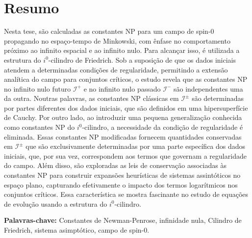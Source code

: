 
\section*{Resumo}


Nesta tese, são calculadas as constantes NP para um campo de spin-0 propagando no espaço-tempo de Minkowski, com ênfase no comportamento próximo ao infinito espacial e ao infinito nulo. Para alcançar isso, é utilizada a estrutura do $i^0$-cilindro de Friedrich. Sob a suposição de que os dados iniciais atendem a determinadas condições de regularidade, permitindo a extensão analítica do campo para conjuntos críticos, o estudo revela que as constantes NP no infinito nulo futuro $\mathscr{I}^{+}$ e no infinito nulo passado $\mathscr{I}^{-}$ são independentes uma da outra. Noutras palavras, as constantes NP clássicas em $\mathscr{I}^{\pm}$ são determinadas por partes diferentes dos dados iniciais, que são definidos em uma hipersuperfície de Cauchy.
Por outro lado, ao introduzir uma pequena generalização conhecida como constantes NP do $i^0$-cilindro, a necessidade da condição de regularidade é eliminada. Essas constantes NP modificadas fornecem quantidades conservadas em $\mathscr{I}^{\pm}$ que são exclusivamente determinadas por uma parte específica dos dados iniciais, que, por sua vez, correspondem aos termos que governam a regularidade do campo. Além disso, são exploradas as leis de conservação associadas às constantes NP para construir expansões heurísticas de sistemas assintóticos no espaço plano, capturando efetivamente o impacto dos termos logarítmicos nos conjuntos críticos. Essa característica se mostra fascinante no estudo de equações de evolução usando a estrutura do $i^0$-cilindro.

\vfill

\textbf{\Large Palavras-chave:} Constantes de Newman-Penrose, infinidade nula, Cilindro de Friedrich, sistema asimptótico, campo de spin-0.

